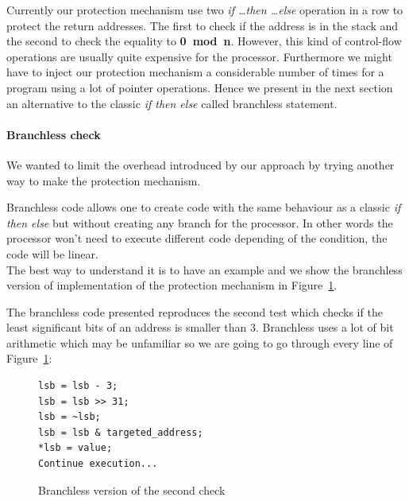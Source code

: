 \documentclass[11pt]{sdm}
\begin{document}
Currently our protection mechanism use two \textit{if \dots then \dots else} operation in a row to protect the return addresses. The first to check if the address is in the stack and the second to check the equality to \textbf{0~mod~n}.
However, this kind of control-flow operations are usually quite expensive for the processor. Furthermore we might have to inject our protection mechanism a considerable number of times for a program using a lot of pointer operations.
Hence we present in the next section an alternative to the classic \textit{if then else} called branchless statement.

\paragraph{Branchless check}
\label{par:Branchless check}

We wanted to limit the overhead introduced by our approach by trying another way to make the protection mechanism. 

Branchless code allows one to create code with the same behaviour as a classic \textit{if then else} but without creating any branch for the processor. In other words the processor won't need to execute different code depending of the condition, the code will be linear.\\
The best way to understand it is to have an example and we show the branchless version of implementation of the protection mechanism in Figure~\ref{branchless}.

The branchless code presented reproduces the second test which checks if the least significant bits of an address is smaller than 3. Branchless uses a lot of bit arithmetic which may be unfamiliar so we are going to go through every line of Figure~\ref{branchless}:

\begin{figure}[!ht]
\centering
\begin{lstlisting}
lsb = lsb - 3;
lsb = lsb >> 31;
lsb = ~lsb;
lsb = lsb & targeted_address;
*lsb = value;
Continue execution...
\end{lstlisting}
\caption{Branchless version of the second check}
\label{branchless}
\end{figure}
\end{document}
